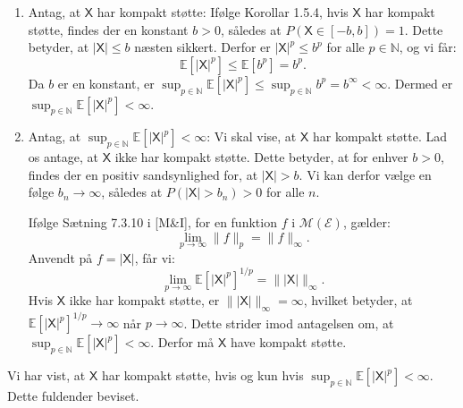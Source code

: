 \documentclass{Class}
\newcommand{\N}{\mathbb{N}}
\newcommand{\E}{\mathbb{E}}
\newcommand{\1}{\mathbbm{1}}
\newcommand{\X}{\mathsf{X}}
\theoremstyle{boxed}
\begin{document}
\begin{enumerate}
  \item Antag, at \(\X\) har kompakt støtte:
Ifølge Korollar 1.5.4, hvis \(\X\) har kompakt støtte, findes der en konstant \(b > 0\), således at \(P(\X \in [-b, b]) = 1\). Dette betyder, at \(|\X| \leq b\) næsten sikkert. Derfor er \(|\X|^p \leq b^p\) for alle \(p \in \N\), og vi får:
\[
\E[|\X|^p] \leq \E[b^p] = b^p.
\]
Da \(b\) er en konstant, er \(\sup_{p\in\N}\E[|\X|^p] \leq \sup_{p\in\N} b^p = b^\infty < \infty\). Dermed er \(\sup_{p\in\N}\E[|\X|^p] < \infty\).

\item Antag, at \(\sup_{p\in\N}\E[|\X|^p] < \infty\):
Vi skal vise, at \(\X\) har kompakt støtte. Lad os antage, at \(\X\) ikke har kompakt støtte. Dette betyder, at for enhver \(b > 0\), findes der en positiv sandsynlighed for, at \(|\X| > b\). Vi kan derfor vælge en følge \(b_n \to \infty\), således at \(P(|\X| > b_n) > 0\) for alle \(n\).

Ifølge Sætning 7.3.10 i [M\&I], for en funktion \(f\) i \(\mathcal{M}(\mathcal{E})\), gælder:
\[
\lim_{p \to \infty} \|f\|_p = \|f\|_\infty.
\]
Anvendt på \(f = |\X|\), får vi:
\[
\lim_{p \to \infty} \E[|\X|^p]^{1/p} = \| |\X| \|_\infty.
\]
Hvis \(\X\) ikke har kompakt støtte, er \(\| |\X| \|_\infty = \infty\), hvilket betyder, at \(\E[|\X|^p]^{1/p} \to \infty\) når \(p \to \infty\). Dette strider imod antagelsen om, at \(\sup_{p\in\N}\E[|\X|^p] < \infty\). Derfor må \(\X\) have kompakt støtte.
\end{enumerate}
Vi har vist, at \(\X\) har kompakt støtte, hvis og kun hvis \(\sup_{p\in\N}\E[|\X|^p] < \infty\). Dette fuldender beviset.
\end{document}
